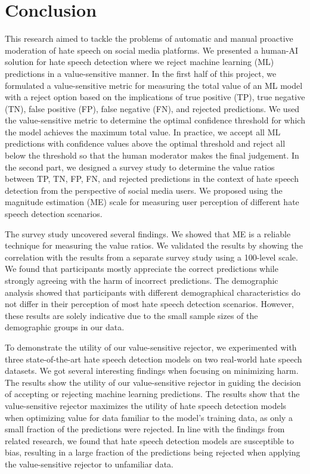 \chapter{Conclusion}
\label{ch:conclusion}
This research aimed to tackle the problems of automatic and manual proactive moderation of hate speech on social media platforms.
%
We presented a human-AI solution for hate speech detection where we reject machine learning (ML) predictions in a value-sensitive manner.
%
In the first half of this project, we formulated a value-sensitive metric for measuring the total value of an ML model with a reject option based on the implications of true positive (TP), true negative (TN), false positive (FP), false negative (FN), and rejected predictions.
%
We used the value-sensitive metric to determine the optimal confidence threshold for which the model achieves the maximum total value.
%
In practice, we accept all ML predictions with confidence values above the optimal threshold and reject all below the threshold so that the human moderator makes the final judgement.
%
In the second part, we designed a survey study to determine the value ratios between TP, TN, FP, FN, and rejected predictions in the context of hate speech detection from the perspective of social media users.
%
We proposed using the magnitude estimation (ME) scale for measuring user perception of different hate speech detection scenarios.
%

%
The survey study uncovered several findings.
%
We showed that ME is a reliable technique for measuring the value ratios.
%
We validated the results by showing the correlation with the results from a separate survey study using a 100-level scale.
%
We found that participants mostly appreciate the correct predictions while strongly agreeing with the harm of incorrect predictions.
%
The demographic analysis showed that participants with different demographical characteristics do not differ in their perception of most hate speech detection scenarios.
%
However, these results are solely indicative due to the small sample sizes of the demographic groups in our data.
%

%
To demonstrate the utility of our value-sensitive rejector, we experimented with three state-of-the-art hate speech detection models on two real-world hate speech datasets.
%
We got several interesting findings when focusing on minimizing harm.
%
The results show the utility of our value-sensitive rejector in guiding the decision of accepting or rejecting machine learning predictions.
%
The results show that the value-sensitive rejector maximizes the utility of hate speech detection models when optimizing value for data familiar to the model's training data, as only a small fraction of the predictions were rejected.
%
In line with the findings from related research, we found that hate speech detection models are susceptible to bias, resulting in a large fraction of the predictions being rejected when applying the value-sensitive rejector to unfamiliar data.
